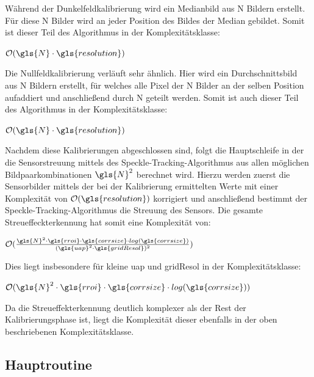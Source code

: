 Während der Dunkelfeldkalibrierung wird ein Medianbild aus \gls{N} Bildern erstellt. Für diese \gls{N} Bilder wird an jeder Position des Bildes der Median gebildet. Somit ist dieser Teil des Algorithmus in der Komplexitätsklasse:

\begin{center}
	$\mathcal{O}(\gls{N} \cdot \gls{resolution})$
\end{center}

Die Nullfeldkalibrierung verläuft sehr ähnlich. Hier wird ein Durchschnittsbild aus \gls{N} Bildern erstellt, für welches alle Pixel  der \gls{N} Bilder an der selben Position aufaddiert und anschließend durch \gls{N} geteilt werden. Somit ist auch dieser Teil des Algorithmus in der Komplexitätsklasse:

\begin{center}
	$\mathcal{O}(\gls{N} \cdot \gls{resolution})$
\end{center}

Nachdem diese Kalibrierungen abgeschlossen sind, folgt die Hauptschleife in der die Sensorstreuung mittels des Speckle-Tracking-Algorithmus aus allen möglichen Bildpaarkombinationen $\gls{N}^2$ berechnet wird. Hierzu werden zuerst die Sensorbilder mittels der bei der Kalibrierung ermittelten Werte mit einer Komplexität von $\mathcal{O}(\gls{resolution})$ korrigiert und anschließend bestimmt der Speckle-Tracking-Algorithmus die Streuung des Sensors. Die gesamte Streueffeckterkennung hat somit eine Komplexität von: 

\begin{center}
	$\mathcal{O}(\frac{\gls{N}^2 \cdot\gls{rroi} \cdot \gls{corrsize} \cdot log(\gls{corrsize})}{(\gls{uap}^2 \cdot \gls{gridResol})^2})$
\end{center}

Dies liegt insbesondere für kleine \gls{uap} und \gls{gridResol} in der Komplexitätsklasse:

\begin{center}
	$\mathcal{O}(\gls{N}^2 \cdot\gls{rroi} \cdot \gls{corrsize} \cdot log(\gls{corrsize}))$
\end{center}

Da die Streueffekterkennung deutlich komplexer als der Rest der Kalibrierungsphase ist, liegt die Komplexität dieser ebenfalls in der oben beschriebenen Komplexitätsklasse. 

\subsection{Hauptroutine}

